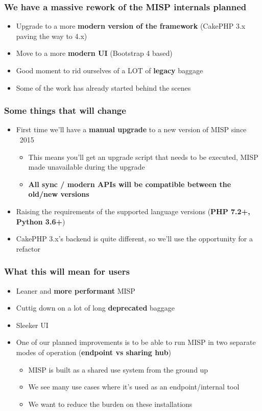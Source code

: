 
\begin{frame}
\titlepage
\end{frame}

\begin{frame}
  \frametitle{We have a massive rework of the MISP internals planned}
  \begin{itemize}
    \item Upgrade to a more {\bf modern version of the framework} (CakePHP 3.x paving the way to 4.x)
    \item Move to a more {\bf modern UI} (Bootstrap 4 based)
    \item Good moment to rid ourselves of a LOT of {\bf legacy} baggage
    \item Some of the work has already started behind the scenes
  \end{itemize}
\end{frame}

\begin{frame}
  \frametitle{Some things that will change}
  \begin{itemize}
    \item First time we'll have a {\bf manual upgrade} to a new version of MISP since ~2015
    \begin{itemize}
      \item This means you'll get an upgrade script that needs to be executed, MISP made unavailable during the upgrade
      \item {\bf All sync / modern APIs will be compatible between the old/new versions}
    \end{itemize}
    \item Raising the requirements of the supported language versions ({\bf PHP 7.2+, Python 3.6+})
    \item CakePHP 3.x's backend is quite different, so we'll use the opportunity for a refactor
  \end{itemize}
\end{frame}

\begin{frame}
  \frametitle{What this will mean for users}
  \begin{itemize}
    \item Leaner and {\bf more performant} MISP 
    \item Cuttig down on a lot of long {\bf deprecated} baggage
    \item Sleeker UI
    \item One of our planned improvements is to be able to run MISP in two separate modes of operation ({\bf endpoint vs sharing hub})
    \begin{itemize}
      \item MISP is built as a shared use system from the ground up
      \item We see many use cases where it's used as an endpoint/internal tool
      \item We want to reduce the burden on these installations
    \end{itemize}
  \end{itemize}
\end{frame}

